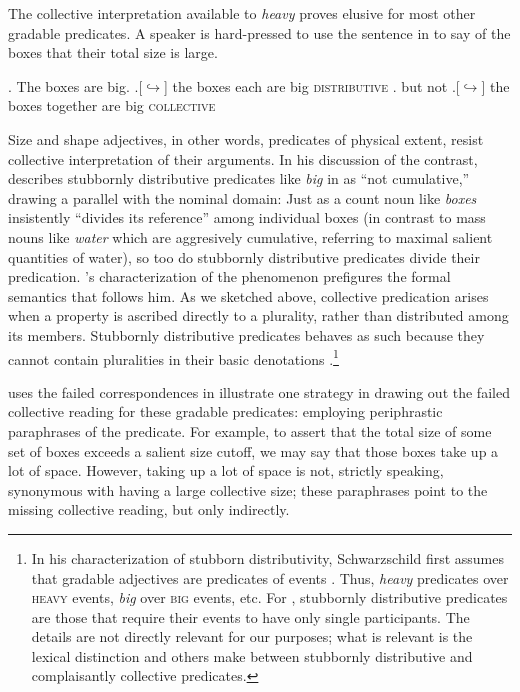 \documentclass[linguex]{sp}
\begin{document}
The collective interpretation available to \emph{heavy} proves elusive for most other gradable predicates. A speaker is hard-pressed to use the sentence in \Next to say of the boxes that their total size is large.

\ex. The boxes are big.
\a.[$\hookrightarrow$] the boxes each are big \hfill \textsc{distributive}
\z. but not
\a.[$\hookrightarrow$] the boxes together are big \hfill \textsc{collective}

Size and shape adjectives, in other words, predicates of physical extent, resist collective interpretation of their arguments. In his discussion of the contrast, \citet{quine1960} describes stubbornly distributive predicates like \emph{big} in \Last as ``not cumulative,'' drawing a parallel with the nominal domain: Just as a count noun like \emph{boxes} insistently ``divides its reference'' among individual boxes (in contrast to mass nouns like \emph{water} which are aggresively cumulative, referring to maximal salient quantities of water), so too do stubbornly distributive predicates divide their predication. \citeauthor{quine1960}'s characterization of the phenomenon prefigures the formal semantics that follows him. As we sketched above, collective predication arises when a property is ascribed directly to a plurality, rather than distributed among its members. Stubbornly distributive predicates behaves as such because they cannot contain pluralities in their basic denotations \citep{schwarzschild2011,vazquezrojas2012,zhang2013}.\footnote{In his characterization of stubborn distributivity, Schwarzschild first assumes that gradable adjectives are predicates of events \citep[e.g.,][]{higginbothamschein1989}. Thus, \emph{heavy} predicates over \textsc{heavy} events, \emph{big} over \textsc{big} events, etc. For \citeauthor{schwarzschild2011}, stubbornly distributive predicates are those that require their events to have only single participants. The details are not directly relevant for our purposes; what is relevant is the lexical distinction \citeauthor{schwarzschild2011} and others make between stubbornly distributive and complaisantly collective predicates.}

\citet{schwarzschild2011} uses the failed correspondences in \Next illustrate one strategy in drawing out the failed collective reading for these gradable predicates: employing periphrastic paraphrases of the predicate. For example, to assert that the total size of some set of boxes exceeds a salient size cutoff, we may say that those boxes take up a lot of space. However, taking up a lot of space is not, strictly speaking, synonymous with having a large collective size; these paraphrases point to the missing collective reading, but only indirectly.\\
\end{document}

